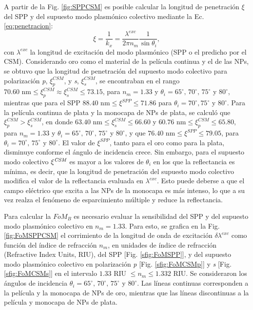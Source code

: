 A partir de la  Fig. \ref{fig:SPPCSM} es posible calcular la longitud de penetración $\xi$ del SPP y del supuesto modo plasmónico colectivo mediante la Ec. \eqref{eq:penetracion}:
%
\begin{equation*}
\xi=\frac{1}{k_x}= \frac{\lambda^{exc}}{2\pi n_m}\frac{1}{\sin\theta_i} ,
\end{equation*}
%
con $\lambda^{exc}$ la longitud de excitación del modo plasmónico (SPP o el predicho por el CSM). Considerando oro como el material de la película continua y el de las NPs, se obtuvo que la longitud de penetración del supuesto modo colectivo para polarización \emph{p}, $\xi^{\textit{CSM}}_p$, y \emph{s}, $\xi^{\textit{CSM}}_s$, se encontraban en el rango $70.60\mbox{ nm}\leq \xi^{\textit{CSM}}_p\approx\xi^{\textit{CSM}}_s\leq 73.15$, para $n_m=1.33$ y $\theta_i=65^\circ,\, 70^\circ,\, 75^\circ$ y $80^\circ$, mientras que para el SPP $88.40\mbox{ nm}\leq \xi^{\textit{SPP}}\leq 71.86$ para $\theta_i= 70^\circ, 75^\circ$ y $80^\circ$. Para la película continua de  plata y la monocapa de NPs de plata, se calculó que $\xi^{\textit{CSM}}_p>\xi^{\textit{CSM}}_s$, en donde $63.40\mbox{ nm}\leq \xi^{\textit{CSM}}_s \leq 66.60$ y $60.76\mbox{ nm}\leq \xi^{\textit{CSM}}_p\leq 65.80$, para $n_m=1.33$ y $\theta_i=65^\circ,\, 70^\circ,\, 75^\circ$ y $80^\circ$, y que $76.40\mbox{ nm}\leq \xi^{\textit{SPP}}\leq 79.05$, para $\theta_i= 70^\circ,\, 75^\circ$ y $80^\circ$. El valor de $\xi^{\textit{SPP}}$, tanto para el oro como para la plata, disminuye conforme el ángulo de incidencia crece. Sin embargo, para el supuesto modo colectivo $\xi^{\textit{\textit{CSM}}}$ es mayor a los valores de $\theta_i$ en los que la reflectancia es mínima, es decir, que la longitud de penetración del supuesto modo colectivo modifica el valor de la reflectancia evaluada en $\lambda^{exc}$. Esto puede deberse a que el campo eléctrico que excita a las NPs de la monocapa es más intenso, lo que a su vez realza el fenómeno de esparcimiento múltiple y reduce la reflectancia.

Para calcular la $\textit{FoM}_B$ es necesario evaluar la sensibilidad del SPP y del supuesto modo plasmónico  colectivo en $n_m=1.33$. Para esto, se grafica en la Fig. \ref{fig:FoMSPPCSM} el corrimiento de la longitud de onda de excitación $\delta\lambda^{exc}$ como función del índice de refracción $n_m$, en unidades de índice de refracción (Refractive Index Units, RIU),  del SPP [Fig. \ref{sfig:FoMSPP}], y del supuesto modo  plasmónico colectivo en polarización \emph{p} [Fig. \ref{sfig:FoMCSMp}] y \emph{s} [Fig. \ref{sfig:FoMCSMs}]  en el intervalo $1.33$ RIU $\leq n_m\leq 1.332$ RIU. Se consideraron los ángulos de incidencia $\theta_i=65^\circ,\, 70^\circ,\, 75^\circ$ y $80^\circ$. Las líneas continuas corresponden a la película y la monocapa de NPs de oro, mientras que las líneas discontinuas a la película y monocapa de NPs de plata. 

